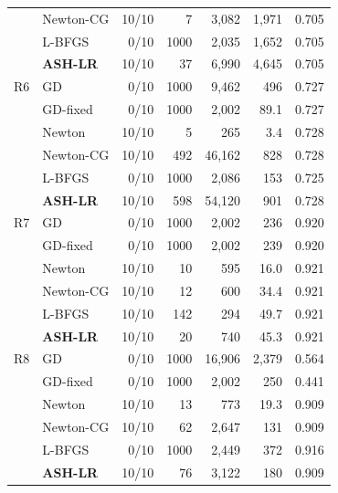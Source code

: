 \begin{tabular}{llrrrrr}
 & Newton-CG & 10/10 & 7 & 3,082 & 1,971 & 0.705 \\
 & L-BFGS & 0/10 & 1000 & 2,035 & 1,652 & 0.705 \\
 & \textbf{ASH-LR} & 10/10 & 37 & 6,990 & 4,645 & 0.705 \\
\midrule
R6 & GD & 0/10 & 1000 & 9,462 & 496 & 0.727 \\
 & GD-fixed & 0/10 & 1000 & 2,002 & 89.1 & 0.727 \\
 & Newton & 10/10 & 5 & 265 & 3.4 & 0.728 \\
 & Newton-CG & 10/10 & 492 & 46,162 & 828 & 0.728 \\
 & L-BFGS & 0/10 & 1000 & 2,086 & 153 & 0.725 \\
 & \textbf{ASH-LR} & 10/10 & 598 & 54,120 & 901 & 0.728 \\
\midrule
R7 & GD & 0/10 & 1000 & 2,002 & 236 & 0.920 \\
 & GD-fixed & 0/10 & 1000 & 2,002 & 239 & 0.920 \\
 & Newton & 10/10 & 10 & 595 & 16.0 & 0.921 \\
 & Newton-CG & 10/10 & 12 & 600 & 34.4 & 0.921 \\
 & L-BFGS & 10/10 & 142 & 294 & 49.7 & 0.921 \\
 & \textbf{ASH-LR} & 10/10 & 20 & 740 & 45.3 & 0.921 \\
\midrule
R8 & GD & 0/10 & 1000 & 16,906 & 2,379 & 0.564 \\
 & GD-fixed & 0/10 & 1000 & 2,002 & 250 & 0.441 \\
 & Newton & 10/10 & 13 & 773 & 19.3 & 0.909 \\
 & Newton-CG & 10/10 & 62 & 2,647 & 131 & 0.909 \\
 & L-BFGS & 0/10 & 1000 & 2,449 & 372 & 0.916 \\
 & \textbf{ASH-LR} & 10/10 & 76 & 3,122 & 180 & 0.909 \\
\bottomrule
\end{tabular}